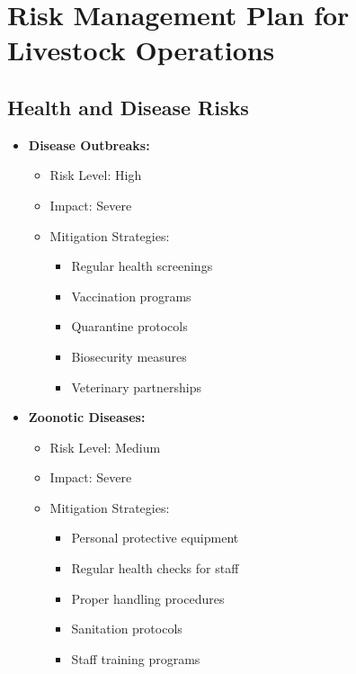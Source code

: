 \section{Risk Management Plan for Livestock Operations}

\subsection{Health and Disease Risks}
\begin{itemize}
    \item \textbf{Disease Outbreaks:}
    \begin{itemize}
        \item Risk Level: High
        \item Impact: Severe
        \item Mitigation Strategies:
        \begin{itemize}
            \item Regular health screenings
            \item Vaccination programs
            \item Quarantine protocols
            \item Biosecurity measures
            \item Veterinary partnerships
        \end{itemize}
    \end{itemize}
    
    \item \textbf{Zoonotic Diseases:}
    \begin{itemize}
        \item Risk Level: Medium
        \item Impact: Severe
        \item Mitigation Strategies:
        \begin{itemize}
            \item Personal protective equipment
            \item Regular health checks for staff
            \item Proper handling procedures
            \item Sanitation protocols
            \item Staff training programs
        \end{itemize}
    \end{itemize}
\end{itemize}

